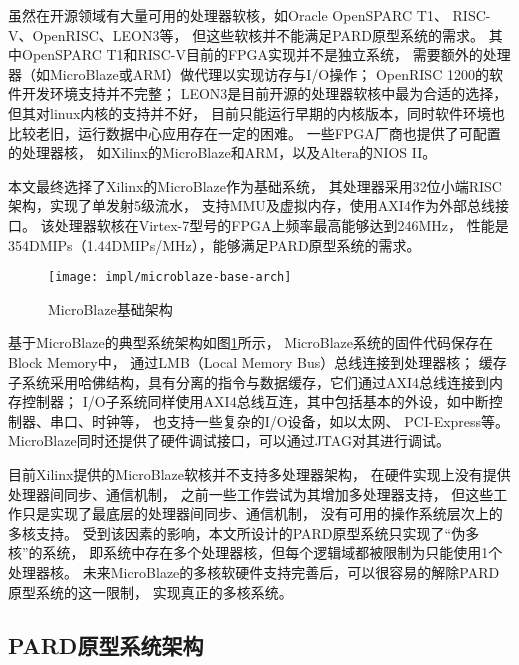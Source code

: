虽然在开源领域有大量可用的处理器软核，如Oracle OpenSPARC T1\cite{opensparct1}、
RISC-V\cite{riscv}、OpenRISC\cite{or1k}、LEON3\cite{leon3}等，
但这些软核并不能满足PARD原型系统的需求。
其中OpenSPARC T1和RISC-V目前的FPGA实现并不是独立系统，
需要额外的处理器（如MicroBlaze或ARM）做代理以实现访存与I/O操作；
OpenRISC 1200的软件开发环境支持并不完整；
LEON3是目前开源的处理器软核中最为合适的选择，但其对linux内核的支持并不好，
目前只能运行早期的内核版本，同时软件环境也比较老旧，运行数据中心应用存在一定的困难。
一些FPGA厂商也提供了可配置的处理器核，
如Xilinx的MicroBlaze\cite{microblaze}和ARM\cite{zynq}，以及Altera的NIOS II\cite{niosii}。

本文最终选择了Xilinx的MicroBlaze作为基础系统，
其处理器采用32位小端RISC架构，实现了单发射5级流水，
支持MMU及虚拟内存，使用AXI4作为外部总线接口\cite{microblaze-ref}。
该处理器软核在Virtex-7型号的FPGA上频率最高能够达到246MHz，
性能是354DMIPs（1.44DMIPs/MHz）\cite{microblaze}，能够满足PARD原型系统的需求。

\begin{figure}[tb]
  \centering
  \texttt{[image: impl/microblaze-base-arch]}
  \caption{MicroBlaze基础架构}
  \label{fig:microblaze-base-arch}
\end{figure}


基于MicroBlaze的典型系统架构如图\ref{fig:microblaze-base-arch}所示，
MicroBlaze系统的固件代码保存在Block Memory中，
通过LMB（Local Memory Bus）总线连接到处理器核；
缓存子系统采用哈佛结构，具有分离的指令与数据缓存，它们通过AXI4总线连接到内存控制器；
I/O子系统同样使用AXI4总线互连，其中包括基本的外设，如中断控制器、串口、时钟等，
也支持一些复杂的I/O设备，如以太网\cite{axi-ethernet-subsystem}、
PCI-Express\cite{axi-pcie-bridge}等。
MicroBlaze同时还提供了硬件调试接口，可以通过JTAG对其进行调试。

目前Xilinx提供的MicroBlaze软核并不支持多处理器架构，
在硬件实现上没有提供处理器间同步、通信机制，
之前一些工作\cite{microblaze-mp-rsp08,microblaze-mp-xapp}尝试为其增加多处理器支持，
但这些工作只是实现了最底层的处理器间同步、通信机制，
没有可用的操作系统层次上的多核支持。
受到该因素的影响，本文所设计的PARD原型系统只实现了``伪多核''的系统，
即系统中存在多个处理器核，但每个逻辑域都被限制为只能使用1个处理器核。
未来MicroBlaze的多核软硬件支持完善后，可以很容易的解除PARD原型系统的这一限制，
实现真正的多核系统。


\subsection{PARD原型系统架构}

